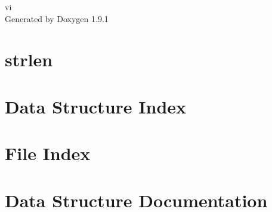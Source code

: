 \let\mypdfximage\pdfximage\def\pdfximage{\immediate\mypdfximage}\documentclass[twoside]{book}
\newcommand{\+}{\discretionary{\mbox{\scriptsize$\hookleftarrow$}}{}{}}
\newcommand{\clearemptydoublepage}{%
  \newpage{\pagestyle{empty}\cleardoublepage}%
}
\begin{document}
\raggedbottom

\hypersetup{pageanchor=false,
             bookmarksnumbered=true,
             pdfencoding=unicode
            }
\begin{titlepage}
\vspace*{7cm}
\begin{center}%
{\Large vi }\\
\vspace*{1cm}
{\large Generated by Doxygen 1.9.1}\\
\end{center}
\end{titlepage}
\clearemptydoublepage
{}
\tableofcontents
\clearemptydoublepage
{}
\hypersetup{pageanchor=true}

\chapter{strlen}
\label{strlen}

\chapter{Data Structure Index}

\chapter{File Index}

\chapter{Data Structure Documentation}

\end{document}
